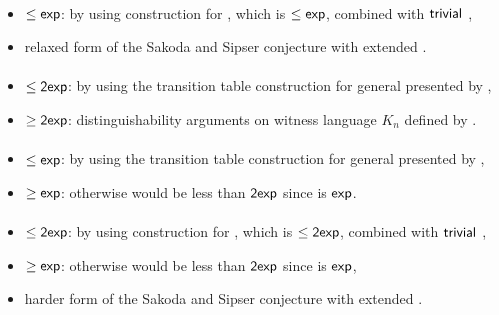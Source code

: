\paragraph{\TNFA{}\tto\OMODLA}
\begin{itemize}
	\item $\le\mathsf{exp}$: by using construction for \hyperref[cost:2NFAto1DFA]{\TNFA{}\tto\ODFA}, which is $\le\mathsf{exp}$, combined with $\mathsf{trivial}$ \ODFA{}\tto\OMODLA,
	\item relaxed form of the Sakoda and Sipser conjecture with extended \TDFA.
\end{itemize}
\paragraph{\OMOLA{}\tto\ODFA}\label{cost:OM1LAto1DFA}
\begin{itemize}
	\item $\le\mathsf{2exp}$: by using the transition table construction for general \OLA presented by ,
	\item $\ge\mathsf{2exp}$: distinguishability arguments on witness language $K_n$ defined by .
\end{itemize}
\paragraph{\OMOLA{}\tto\ONFA}\label{cost:OM1LAto1NFA}
\begin{itemize}
	\item $\le\mathsf{exp}$: by using the transition table construction for general \OLA presented by ,
	\item $\ge\mathsf{exp}$: otherwise \hyperref[cost:OM1LAto1DFA]{\OMOLA{}\tto\ODFA} would be less than $\mathsf{2exp}$ since\linebreak\hyperref[cost:1NFAto1DFA]{\ONFA{}\tto\ODFA} is $\mathsf{exp}$.
\end{itemize}
\paragraph{\OMOLA{}\tto\TDFA}
\begin{itemize}
	\item $\le\mathsf{2exp}$: by using construction for \hyperref[cost:OM1LAto1DFA]{\OMOLA{}\tto\ODFA}, which is $\le\mathsf{2exp}$, combined with $\mathsf{trivial}$ \ODFA{}\tto\TDFA,
	\item $\ge\mathsf{exp}$: otherwise \hyperref[cost:OM1LAto1DFA]{\OMOLA{}\tto\ODFA} would be less than $\mathsf{2exp}$ since\linebreak\hyperref[cost:2DFAto1DFA]{\TDFA{}\tto\ODFA} is $\mathsf{exp}$,
	\item harder form of the Sakoda and Sipser conjecture with extended \TNFA.
\end{itemize}
